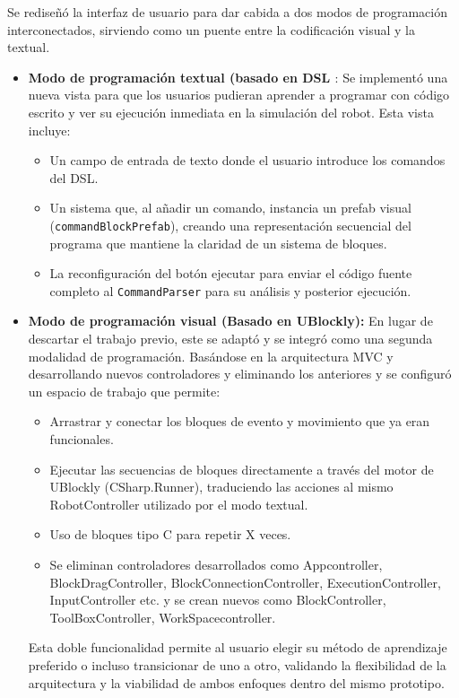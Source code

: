 	Se rediseñó la interfaz de usuario para dar cabida a dos modos de programación interconectados, sirviendo como un puente entre la codificación visual y la textual.
	
\begin{itemize}
		\item \textbf{Modo de programación textual (basado en DSL \cite{DSL}\cite{lenguaje_DSL}}: Se implementó una nueva vista para que los usuarios pudieran aprender a programar con código escrito y ver su ejecución inmediata en la simulación del robot. Esta vista incluye:
		\begin{itemize}
			\item Un campo de entrada de texto donde el usuario introduce los comandos del DSL.
			\item Un sistema que, al añadir un comando, instancia un prefab visual (\texttt{commandBlockPrefab}), creando una representación secuencial del programa que mantiene la claridad de un sistema de bloques.
			\item La reconfiguración del botón ejecutar para enviar el código fuente completo al \texttt{CommandParser} para su análisis y posterior ejecución.
		\end{itemize}
		
		\item \textbf{Modo de programación visual (Basado en UBlockly):} En lugar de descartar el trabajo previo, este se adaptó y se integró como una segunda modalidad de programación. Basándose en la arquitectura MVC y desarrollando nuevos controladores y eliminando los anteriores y se configuró un espacio de trabajo que permite:
		\begin{itemize}
			\item Arrastrar y conectar los bloques de evento y movimiento que ya eran funcionales.
			\item Ejecutar las secuencias de bloques directamente a través del motor de UBlockly (CSharp.Runner), traduciendo las acciones al mismo RobotController utilizado por el modo textual.
			\item Uso de bloques tipo C para repetir X veces.
			\item Se eliminan controladores desarrollados como Appcontroller, BlockDragController, BlockConnectionController, ExecutionController, InputController etc. y se crean nuevos como BlockController, ToolBoxController, WorkSpacecontroller.
		
		\end{itemize}

	Esta doble funcionalidad permite al usuario elegir su método de aprendizaje preferido o incluso transicionar de uno a otro, validando la flexibilidad de la arquitectura y la viabilidad de ambos enfoques dentro del mismo prototipo.
	

\end{itemize}
